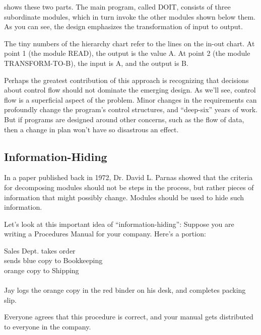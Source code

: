  shows these two parts. The main program, called DOIT,
consists of three subordinate modules, which in turn invoke the other
modules shown below them. As you can see, the design emphasizes the
transformation of input to output. 

The tiny numbers of the hierarchy chart refer to the lines on the
in-out chart. At point 1 (the module READ), the output is the value A.
At point 2 (the module TRANSFORM-TO-B), the input is A, and the output
is B. 

Perhaps the greatest contribution of this approach is recognizing that
decisions about control flow should not dominate the emerging design.
As we'll see, control flow is a superficial aspect of the problem.
Minor changes in the requirements can profoundly change the program's
control structures, and ``deep-six'' years of work.  But if programs
are designed around other concerns, such as the flow of data, then a
change in plan won't have so disastrous an effect.


\subsection{Information-Hiding }
In a paper \cite{parnas72} published back in 1972, Dr. David L. Parnas
 showed
that the criteria for decomposing modules should not be steps in the
process, but rather pieces of information that might possibly change.
Modules should be used to hide such information.

Let's look at this important idea of ``information-hiding'':
Suppose you are writing a Procedures Manual for your company.
Here's a portion:

\begin{tfquot}
Sales Dept. takes order\\
sends blue copy to Bookkeeping\\
orange copy to Shipping\\
 \\
Jay logs the orange copy in the red binder on his desk, and completes
packing slip.
\end{tfquot}
Everyone agrees that this procedure is correct, and your manual gets
distributed to everyone in the company.

